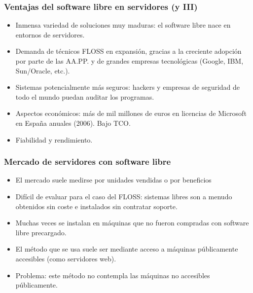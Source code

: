 \documentclass{beamer}
\begin{document}

\begin{frame}
\frametitle{Ventajas del software libre en servidores (y III)}

\begin{itemize}
\item Inmensa \alert{variedad} de soluciones muy \alert{maduras}: el software libre nace en entornos de servidores.
\item Demanda de técnicos FLOSS en expansión, gracias a la creciente adopción por parte de las AA.PP. y de grandes empresas tecnológicas (Google, IBM, Sun/Oracle, etc.).
\item Sistemas \alert{potencialmente más seguros}: hackers y empresas de seguridad de todo el mundo puedan auditar los programas.
\item Aspectos económicos: más de mil millones de euros en licencias de Microsoft en España anuales (2006). Bajo TCO.
\item Fiabilidad y rendimiento.
\end{itemize}
\end{frame}


\begin{frame}
\frametitle{Mercado de servidores con software libre}

\begin{itemize}
\item El mercado suele medirse por unidades vendidas o por beneficios
\item Difícil de evaluar para el caso del FLOSS: sistemas libres son a menudo obtenidos sin coste e instalados sin contratar soporte.
\item Muchas veces se instalan en máquinas que no fueron compradas con software libre precargado.
\item El método que se usa suele ser mediante acceso a máquinas públicamente accesibles (como servidores web).
\item Problema: este método no contempla las máquinas no accesibles públicamente.
\end{itemize}
\end{frame}


\end{document}
